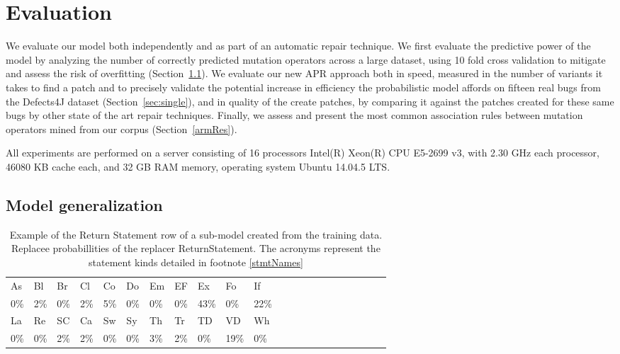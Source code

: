 \documentclass[conference]{IEEEtran}
\begin{document}
\section{Evaluation} \label{evaluation}

We evaluate our model both independently and as part of an automatic repair
technique.  We first evaluate the predictive power of the model by analyzing the
number of correctly predicted mutation operators across a large dataset, using 10 fold cross
validation to mitigate and assess the risk of overfitting
(Section~\ref{sec:generalize}). We evaluate our new APR approach both in speed, measured in the number of variants it takes to find a patch and to precisely validate the potential increase in efficiency the
probabilistic model affords on fifteen real bugs from the Defects4J dataset
(Section~\ref{sec:single}), and in quality of the create patches, by comparing it against the patches created for these same bugs by other state of the art repair techniques.  Finally, we assess and present the most common 
association rules between mutation operators mined from our corpus
(Section~\ref{armRes}). 


All experiments are performed on a server 
consisting of 16 processors Intel(R) Xeon(R) CPU E5-2699 v3, with 2.30 GHz each
processor, 46080 KB cache each, and 32 GB RAM memory, operating system Ubuntu 
14.04.5 LTS.

\subsection{Model generalization}
\label{sec:generalize}
  

\begin{table}[ht]
\begin{tabular}{llllllllllllllllllllll}
\hline
As & Bl & Br & Cl & Co & Do & Em & EF & Ex & Fo & If \\
0\%&2\%&0\%&2\%&5\%&0\%&0\%&0\%&43\%&0\%&22\% \\
\hline 
La & Re & SC & Ca & Sw & Sy & Th & Tr & TD & VD & Wh \\
0\%&0\%&2\%&2\%&0\%&0\%&3\%&2\%&0\%&19\%&0\% \\
\hline
\end{tabular}
\\
\caption{Example of the Return Statement row of a sub-model created from 
the training data. Replacee probabillities of the replacer ReturnStatement. The acronyms represent the statement kinds detailed in footnote \ref{stmtNames}}
 \label{fig:exPredReturn} 
\end{table} 
\end{document}
